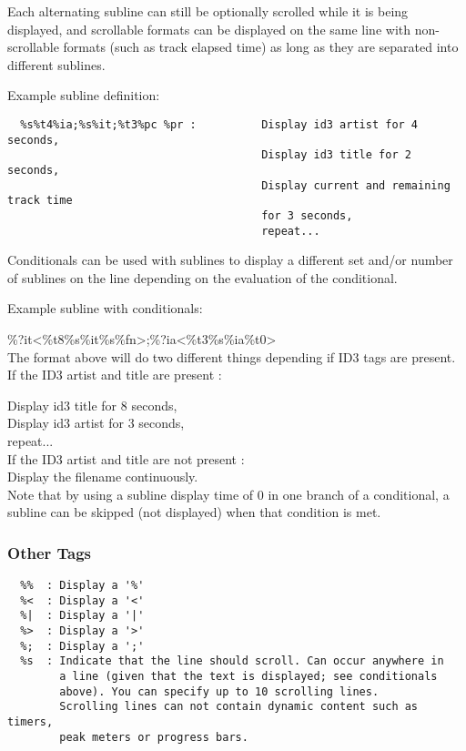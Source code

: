 Each alternating subline can still be optionally scrolled while it is
being displayed, and scrollable formats can be displayed on the same
line with non{}-scrollable formats (such as track elapsed time) as long
as they are separated into different sublines.

Example subline definition:

\begin{verbatim}
  %s%t4%ia;%s%it;%t3%pc %pr :          Display id3 artist for 4 seconds,
                                       Display id3 title for 2 seconds,
                                       Display current and remaining track time
                                       for 3 seconds,
                                       repeat...
\end{verbatim}

Conditionals can be used with sublines to display a different set and/or number of sublines on the line depending on the evaluation of the conditional.

Example subline with conditionals:

\%?it{\textless}\%t8\%s\%it{\textbar}\%s\%fn{\textgreater};\%?ia{\textless}\%t3\%s\%ia{\textbar}\%t0{\textgreater}\\

The format above will do two different things depending if ID3 tags are present. If the ID3 artist and title are present :

Display id3 title for 8 seconds,\\

Display id3 artist for 3 seconds,\\

repeat...\\

If the ID3 artist and title are not present :\\

Display the filename continuously.\\

Note that by using a subline display time of 0 in one branch of a conditional, a subline can be skipped (not displayed) when that condition is met. 

\subsubsection{Other Tags}
\begin{verbatim}
  %%  : Display a '%'
  %<  : Display a '<'
  %|  : Display a '|'
  %>  : Display a '>'
  %;  : Display a ';'
  %s  : Indicate that the line should scroll. Can occur anywhere in
        a line (given that the text is displayed; see conditionals
        above). You can specify up to 10 scrolling lines.
        Scrolling lines can not contain dynamic content such as timers,
        peak meters or progress bars.
\end{verbatim}

